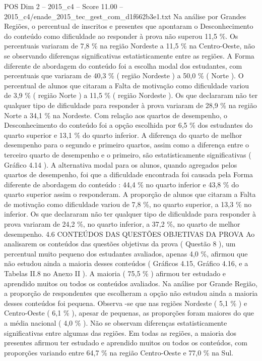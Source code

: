 \begin{textsample}{POS Dim 2 – 2015\_c4 – Score 11.00 – 2015\_c4/enade\_2015\_tec\_gest\_com\_d1f662b3e1.txt}
Na análise por Grandes Regiões, o percentual de inscritos e presentes que apontaram o Desconhecimento do conteúdo como dificuldade ao responder à prova não superou 11,5 \%.
Os percentuais variaram de 7,8 \% na região Nordeste a 11,5 \% na Centro-Oeste, não se observando diferenças significativas estatisticamente entre as regiões.
A Forma diferente de abordagem do conteúdo foi a escolha modal dos estudantes, com percentuais que variaram de 40,3 \% ( região Nordeste ) a 50,0 \% ( Norte ).
O percentual de alunos que citaram a Falta de motivação como dificuldade variou de 3,9 \% ( região Norte ) a 11,5 \% ( região Nordeste ).
Os que declararam não ter qualquer tipo de dificuldade para responder à prova variaram de 28,9 \% na região Norte a 34,1 \% na Nordeste.
Com relação aos quartos de desempenho, o Desconhecimento do conteúdo foi a opção escolhida por 6,5 \% dos estudantes do quarto superior e 13,1 \% do quarto inferior.
A diferença do quarto de melhor desempenho para o segundo e primeiro quartos, assim como a diferença entre o terceiro quarto de desempenho e o primeiro, são estatisticamente significativas ( Gráfico 4.14 ).
A alternativa modal para os alunos, quando agregados pelos quartos de desempenho, foi que a dificuldade encontrada foi causada pela Forma diferente de abordagem do conteúdo : 44,4 \% no quarto inferior e 43,8 \% do quarto superior assim o responderam.
A proporção de alunos que citaram a Falta de motivação como dificuldade variou de 7,8 \%, no quarto superior, a 13,3 \% no inferior.
Os que declararam não ter qualquer tipo de dificuldade para responder à prova variaram de 24,2 \%, no quarto inferior, a 37,2 \%, no quarto de melhor desempenho. 4.6 CONTEÚDOS DAS QUESTÕES OBJETIVAS DA PROVA Ao analisarem os conteúdos das questões objetivas da prova ( Questão 8 ), um percentual muito pequeno dos estudantes avaliados, apenas 4,0 \%, afirmou que não estudou ainda a maioria desses conteúdos ( Gráficos 4.15, Gráfico 4.16, e a Tabelas II.8 no Anexo II ).
A maioria ( 75,5 \% ) afirmou ter estudado e aprendido muitos ou todos os conteúdos avaliados.
Na análise por Grande Região, a proporção de respondentes que escolheram a opção não estudou ainda a maioria desses conteúdos foi pequena.
Observa -se que nas regiões Nordeste ( 5,1 \% ) e Centro-Oeste ( 6,1 \% ), apesar de pequenas, as proporções foram maiores do que a média nacional ( 4,0 \% ).
Não se observam diferenças estatisticamente significativas entre algumas das regiões.
Em todas as regiões, a maioria dos presentes afirmou ter estudado e aprendido muitos ou todos os conteúdos, com proporções variando entre 64,7 \% na região Centro-Oeste e 77,0 \% na Sul.

\end{textsample}
